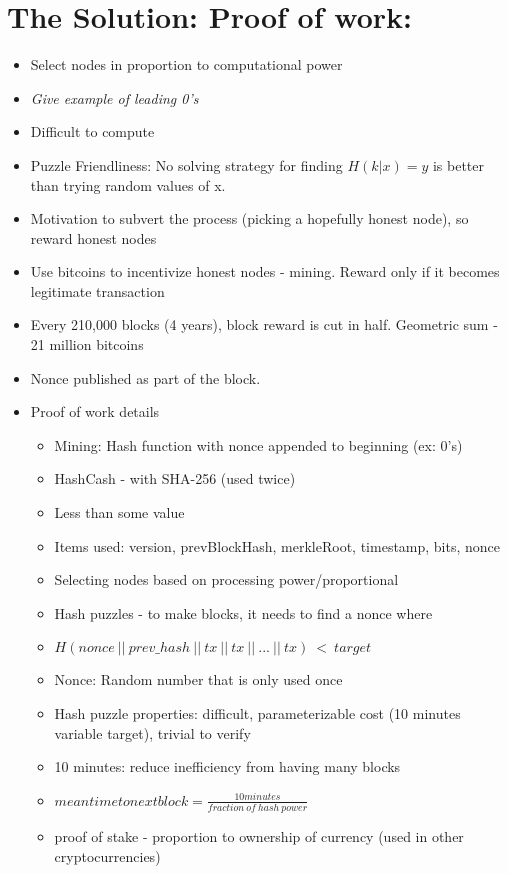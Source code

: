 \documentclass{article}
\begin{document}
\section*{The Solution: Proof of work:}
\begin{itemize}
  \item Select nodes in proportion to computational power
  \item \emph{Give example of leading 0's}
  \item Difficult to compute
  \item Puzzle Friendliness: No solving strategy for finding $H(k | x)=y$ is better than trying random values of x.
  \item Motivation to subvert the process (picking a hopefully honest node), so reward honest nodes
  \item Use bitcoins to incentivize honest nodes - mining. Reward only if it becomes legitimate transaction
  \item Every 210,000 blocks (4 years), block reward is cut in half. Geometric sum - 21 million bitcoins
  \item Nonce published as part of the block.
  \item Proof of work details
    \begin{itemize}
      \item Mining: Hash function with nonce appended to beginning (ex: 0's)
      \item HashCash - with SHA-256 (used twice)
      \item Less than some value
      \item Items used: version, prevBlockHash, merkleRoot, timestamp, bits, nonce
      \item Selecting nodes based on processing power/proportional
      \item Hash puzzles - to make blocks, it needs to find a nonce where
      \item $ H(nonce\ ||\ prev\_hash\ ||\ tx\ ||\ tx\ ||\ ...\ ||\ tx)\ <\ target $
      \item Nonce: Random number that is only used once
      \item Hash puzzle properties: difficult, parameterizable cost (10 minutes variable target), trivial to verify
      \item 10 minutes: reduce inefficiency from having many blocks
      \item $ mean time to next block = \frac{10 minutes}{fraction\ of\ hash\ power} $
      \item proof of stake - proportion to ownership of currency (used in other cryptocurrencies)

\end{itemize}
\end{itemize}
\end{document}
